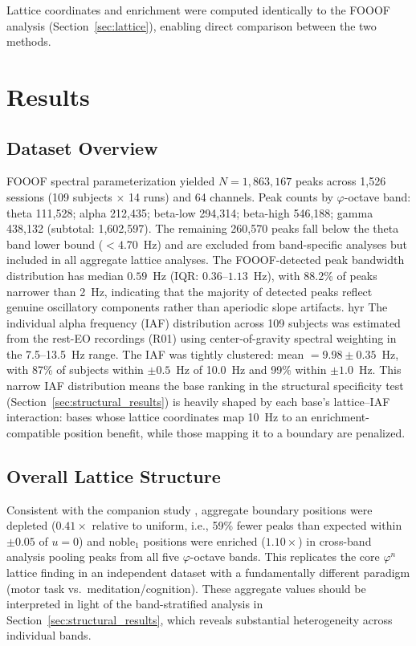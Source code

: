\documentclass[11pt,a4paper]{article}
\newcommand{\phisym}{\varphi}
\begin{document}
Lattice coordinates and enrichment were computed identically to the FOOOF analysis (Section~\ref{sec:lattice}), enabling direct comparison between the two methods.

\section{Results}
\label{sec:results}

\subsection{Dataset Overview}

FOOOF spectral parameterization yielded $N = 1,863,167$ peaks across 1,526 sessions (109 subjects $\times$ 14 runs) and 64 channels. Peak counts by $\phisym$-octave band: theta 111,528; alpha 212,435; beta-low 294,314; beta-high 546,188; gamma 438,132 (subtotal: 1,602,597). The remaining 260,570 peaks fall below the theta band lower bound ($< 4.70$~Hz) and are excluded from band-specific analyses but included in all aggregate lattice analyses. The FOOOF-detected peak bandwidth distribution has median $0.59$~Hz (IQR: $0.36$--$1.13$~Hz), with 88.2\% of peaks narrower than 2~Hz, indicating that the majority of detected peaks reflect genuine oscillatory components rather than aperiodic slope artifacts.
hyr
The individual alpha frequency (IAF) distribution across 109 subjects was estimated from the rest-EO recordings (R01) using center-of-gravity spectral weighting in the 7.5--13.5~Hz range. The IAF was tightly clustered: mean $= 9.98 \pm 0.35$~Hz, with 87\% of subjects within $\pm 0.5$~Hz of 10.0~Hz and 99\% within $\pm 1.0$~Hz. This narrow IAF distribution means the base ranking in the structural specificity test (Section~\ref{sec:structural_results}) is heavily shaped by each base's lattice--IAF interaction: bases whose lattice coordinates map 10~Hz to an enrichment-compatible position benefit, while those mapping it to a boundary are penalized.

\subsection{Overall Lattice Structure}

Consistent with the companion study \parencite{lacy2026golden}, aggregate boundary positions were depleted ($0.41\times$ relative to uniform, i.e., 59\% fewer peaks than expected within $\pm 0.05$ of $u = 0$) and noble$_1$ positions were enriched ($1.10\times$) in cross-band analysis pooling peaks from all five $\phisym$-octave bands. This replicates the core $\phisym^n$ lattice finding in an independent dataset with a fundamentally different paradigm (motor task vs.\ meditation/cognition). These aggregate values should be interpreted in light of the band-stratified analysis in Section~\ref{sec:structural_results}, which reveals substantial heterogeneity across individual bands.
\end{document}
